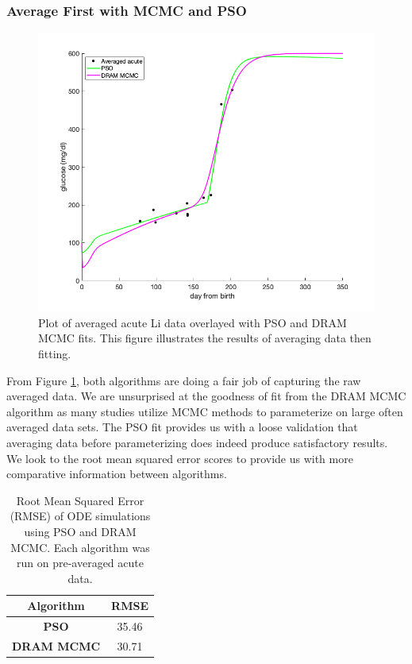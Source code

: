 \documentclass{article}
\begin{document}
\subsubsection{Average First with MCMC and PSO}
\begin{figure}[H]
    \centering
    \includegraphics[width=15cm]{Comparison_Figures/averagethenfit_pso_dram_comp.png}
    \caption{Plot of averaged acute Li data overlayed with PSO and DRAM MCMC fits. This figure illustrates the results of averaging data then fitting.}
    \label{fig:Results_Averaged_PSOMCMC_Fits}
\end{figure}
From Figure \ref{fig:Results_Averaged_PSOMCMC_Fits}, both algorithms are doing a fair job of capturing the raw averaged data. We are unsurprised at the goodness of fit from the DRAM MCMC algorithm as many studies utilize MCMC methods to parameterize on large often averaged data sets. The PSO fit provides us with a loose validation that averaging data before parameterizing does indeed produce satisfactory results. We look to the root mean squared error scores to provide us with more comparative information between algorithms.
\begin{table}[H]
  \begin{center}
    \label{tab:table1}
    \begin{tabular}{c|c} %
      \textbf{Algorithm} & \textbf{RMSE} \\
      \hline
      \textbf{PSO} & 35.46\\
      \textbf{DRAM MCMC} & 30.71\\
    \end{tabular}
    \caption{Root Mean Squared Error (RMSE) of ODE simulations using PSO and DRAM MCMC. Each algorithm was run on pre-averaged acute data.}
    \label{table:Results_Averaged_PSOMCMC_RMSE}
  \end{center}
\end{table}
\end{document}
